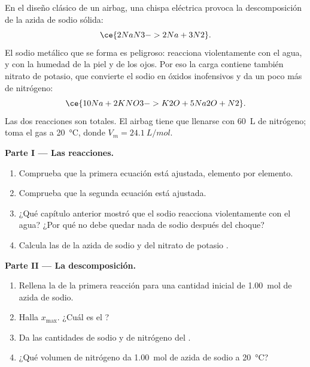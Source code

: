 \begin{problem}
\label{pb:g10:reaction-progress-table:1}
En el diseño clásico de un airbag, una chispa eléctrica provoca la
descomposición de la azida de sodio sólida:
\[
  \ce{2NaN3 -> 2Na + 3N2} .
\]
El sodio metálico que se forma es peligroso: reacciona violentamente
con el agua, y con la humedad de la piel y de los ojos. Por eso la carga
contiene también nitrato de potasio, que convierte el sodio en óxidos
inofensivos y da un poco más de nitrógeno:
\[
  \ce{10Na + 2KNO3 -> K2O + 5Na2O + N2} .
\]
Las dos reacciones son totales. El airbag tiene que llenarse con
\qty{60}{L} de nitrógeno; toma el gas a \qty{20}{\celsius}, donde
$V_m = \qty{24.1}{L/mol}$.

\medskip
\noindent\textbf{Parte I --- Las reacciones.}
\begin{enumerate}
  \item Comprueba que la primera ecuación está ajustada, elemento por
        elemento.
  \item Comprueba que la segunda ecuación está ajustada.
  \item ¿Qué capítulo anterior mostró que el sodio reacciona
        violentamente con el agua? ¿Por qué no debe quedar nada de sodio
        después del choque?
  \item Calcula las  de la azida de sodio  y del
        nitrato de potasio .
\end{enumerate}

\medskip
\noindent\textbf{Parte II --- La descomposición.}
\begin{enumerate}[resume]
  \item Rellena la  de la primera reacción para una
        cantidad inicial de \qty{1.00}{mol} de azida de sodio.
  \item Halla $x_{\max}$. ¿Cuál es el ?
  \item Da las cantidades de sodio y de nitrógeno del .
  \item ¿Qué volumen de nitrógeno da \qty{1.00}{mol} de azida de sodio a
        \qty{20}{\celsius}?
\end{enumerate}


\end{problem}
